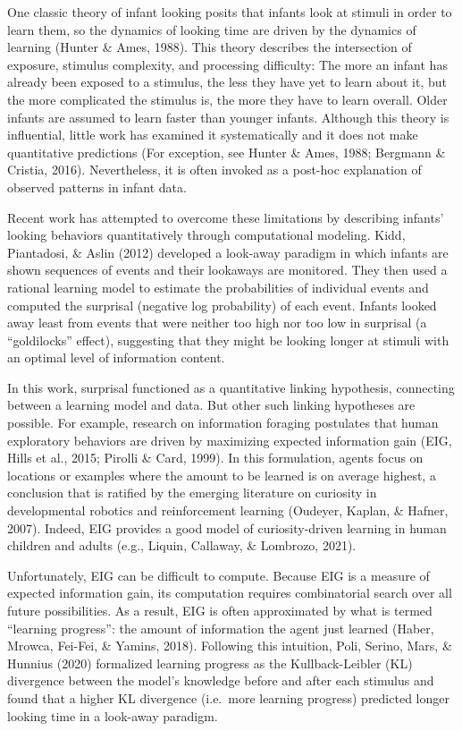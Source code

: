 \documentclass[10pt, letterpaper]{article}
\begin{document}
One classic theory of infant looking posits that infants look at stimuli
in order to learn them, so the dynamics of looking time are driven by
the dynamics of learning (Hunter \& Ames, 1988). This theory describes
the intersection of exposure, stimulus complexity, and processing
difficulty: The more an infant has already been exposed to a stimulus,
the less they have yet to learn about it, but the more complicated the
stimulus is, the more they have to learn overall. Older infants are
assumed to learn faster than younger infants. Although this theory is
influential, little work has examined it systematically and it does not
make quantitative predictions (For exception, see Hunter \& Ames, 1988;
Bergmann \& Cristia, 2016). Nevertheless, it is often invoked as a
post-hoc explanation of observed patterns in infant data.

Recent work has attempted to overcome these limitations by describing
infants' looking behaviors quantitatively through computational
modeling. Kidd, Piantadosi, \& Aslin (2012) developed a look-away
paradigm in which infants are shown sequences of events and their
lookaways are monitored. They then used a rational learning model to
estimate the probabilities of individual events and computed the
surprisal (negative log probability) of each event. Infants looked away
least from events that were neither too high nor too low in surprisal (a
``goldilocks'' effect), suggesting that they might be looking longer at
stimuli with an optimal level of information content.

In this work, surprisal functioned as a quantitative linking hypothesis,
connecting between a learning model and data. But other such linking
hypotheses are possible. For example, research on information foraging
postulates that human exploratory behaviors are driven by maximizing
expected information gain (EIG, Hills et al., 2015; Pirolli \& Card,
1999). In this formulation, agents focus on locations or examples where
the amount to be learned is on average highest, a conclusion that is
ratified by the emerging literature on curiosity in developmental
robotics and reinforcement learning (Oudeyer, Kaplan, \& Hafner, 2007).
Indeed, EIG provides a good model of curiosity-driven learning in human
children and adults (e.g., Liquin, Callaway, \& Lombrozo, 2021).

Unfortunately, EIG can be difficult to compute. Because EIG is a measure
of expected information gain, its computation requires combinatorial
search over all future possibilities. As a result, EIG is often
approximated by what is termed ``learning progress'': the amount of
information the agent just learned (Haber, Mrowca, Fei-Fei, \& Yamins,
2018). Following this intuition, Poli, Serino, Mars, \& Hunnius (2020)
formalized learning progress as the Kullback-Leibler (KL) divergence
between the model's knowledge before and after each stimulus and found
that a higher KL divergence (i.e.~more learning progress) predicted
longer looking time in a look-away paradigm.
\end{document}
